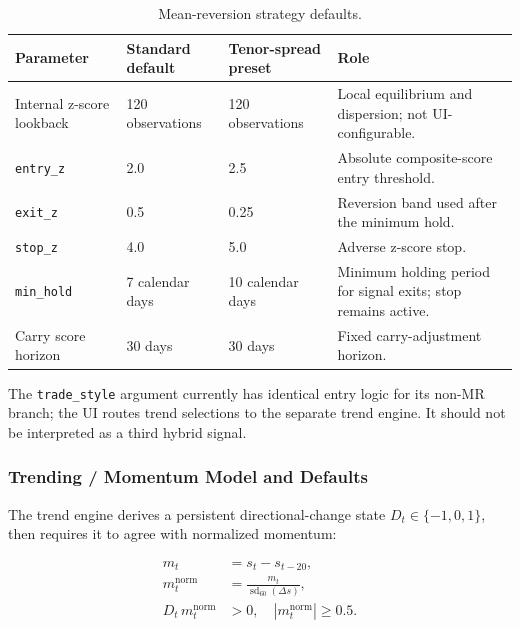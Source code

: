 \begin{table}[htbp]
\centering
\small
\setlength{\tabcolsep}{6pt}
\renewcommand{\arraystretch}{1.2}
\begin{tabular}{p{} p{} p{} p{}}
\hline
\textbf{Parameter} & \textbf{Standard default} & \textbf{Tenor-spread preset} & \textbf{Role} \\
\hline
Internal z-score lookback & 120 observations & 120 observations & Local equilibrium and dispersion; not UI-configurable. \\
\texttt{entry\_z} & 2.0 & 2.5 & Absolute composite-score entry threshold. \\
\texttt{exit\_z} & 0.5 & 0.25 & Reversion band used after the minimum hold. \\
\texttt{stop\_z} & 4.0 & 5.0 & Adverse z-score stop. \\
\texttt{min\_hold} & 7 calendar days & 10 calendar days & Minimum holding period for signal exits; stop remains active. \\
Carry score horizon & 30 days & 30 days & Fixed carry-adjustment horizon. \\
\hline
\end{tabular}
\caption{Mean-reversion strategy defaults.}
\label{tab:pairs-mr-defaults}
\end{table}

The \texttt{trade\_style} argument currently has identical entry logic for its non-MR
branch; the UI routes trend selections to the separate trend engine. It should not
be interpreted as a third hybrid signal.

\subsubsection{Trending / Momentum Model and Defaults}

The trend engine derives a persistent directional-change state
$D_t \in \{-1,0,1\}$, then requires it to agree with normalized momentum:

\begin{equation}
\begin{aligned}
m_t &= s_t - s_{t-20}, \\
m_t^{\mathrm{norm}} &= \frac{m_t}{\operatorname{sd}_{60}(\Delta s)}, \\
D_t\,m_t^{\mathrm{norm}} &> 0, \quad \left|m_t^{\mathrm{norm}}\right| \ge 0.5.
\end{aligned}
\end{equation}

